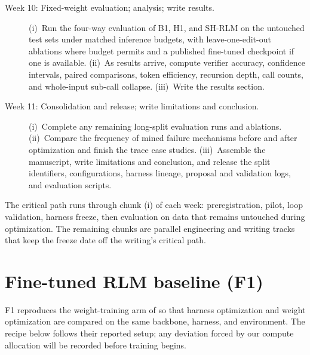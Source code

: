 \documentclass{article}
\newcommand{\rlm}{\textsc{RLM}\xspace}
\begin{document}
\begin{description}
\item[Week 10: Fixed-weight evaluation; analysis; write results.]
(i)~Run the four-way evaluation of B1, H1, and SH-RLM on the untouched test sets under matched inference budgets, with leave-one-edit-out ablations where budget permits and a published fine-tuned checkpoint if one is available. (ii)~As results arrive, compute verifier accuracy, confidence intervals, paired comparisons, token efficiency, recursion depth, call counts, and whole-input sub-call collapse. (iii)~Write the results section.

\item[Week 11: Consolidation and release; write limitations and conclusion.]
(i)~Complete any remaining long-split evaluation runs and ablations. (ii)~Compare the frequency of mined failure mechanisms before and after optimization and finish the trace case studies. (iii)~Assemble the manuscript, write limitations and conclusion, and release the split identifiers, configurations, harness lineage, proposal and validation logs, and evaluation scripts.

\end{description}

The critical path runs through chunk (i) of each week: preregistration, pilot, loop validation, harness freeze, then evaluation on data that remains untouched during optimization. The remaining chunks are parallel engineering and writing tracks that keep the freeze date off the writing's critical path.


\clearpage



\clearpage
\appendix

\section{Fine-tuned \rlm{} baseline (F1)}
\label{app:finetune}

F1 reproduces the weight-training arm of \citet{zhang2026harness} so that harness
optimization and weight optimization are compared on the same backbone, harness, and
environment. The recipe below follows their reported setup; any deviation forced by our
compute allocation will be recorded before training begins.
\end{document}
